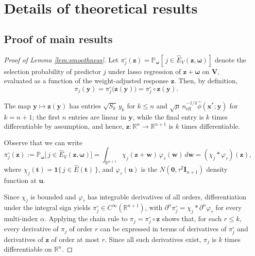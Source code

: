 \documentclass[12pt]{article}
\newcommand{\R}{\mathbb{R}}
\newcommand{\PPo}{\mathbb{P}_{\bm{\omega}}}
\newcommand{\Ehat}{\widehat{E}}
\theoremstyle{definition}
\begin{document}



% 


\appendix

\section{Details of theoretical results}

\subsection{Proof of main results}
\label{App: main}

\begin{proof}[Proof of Lemma \ref{lem:smoothness}]
Let $\pi_j^{\circ}(\bm{z})=\PPo[\,j\in\Ehat_V(\bm{z},\bm{\omega})]$ denote the selection probability of predictor $j$ under lasso regression of $\bm{z}+\bm{\omega}$ on $\bm{V}$, evaluated as a function of the weight-adjusted response $\bm{z}$.
Then, by definition, $$\pi_j(\bm{y})=\pi_j^{\circ}\bigl(\bm{z}(\bm{y})\bigr) = \pi_j^{\circ} \circ \bm{z}(\bm{y}).$$

 
The map $\bm{y} \mapsto \bm{z}(\bm{y})$ has entries $\sqrt{S_k}\,y_k$ for
$k\le n$ and $\sqrt{\mu}\,n_{\mathrm{eff}}^{-1/4}\hat\phi(\bm x^{*};\bm y)$ for $k=n+1$; the first $n$ entries are linear in $\bm y$, while the final entry is $k$ times differentiable by assumption, and hence, $\bm z:\R^{n}\to\R^{n+1}$ is $k$ times differentiable. 
 
Observe that we can write
\[
  \pi_j^{\circ}(\bm z)
  :=\PPo\bigl[\,j\in\Ehat_V(\bm z,\bm\omega)\bigr]
  =\int_{\R^{n+1}}\chi_j(\bm z+\bm w)\,\varphi_\tau(\bm w)\,d\bm w
  =(\chi_j*\varphi_\tau)(\bm z),
\]
where $\chi_j(\bm t)=\mathbf 1\{\,j\in\Ehat(\bm t)\,\}$, and
$\varphi_\tau(\bm u)$ is the $N(\bm 0,\tau^{2}\bm I_{n+1})$ density function at $\bm u$. 

Since $\chi_j$ is bounded and $\varphi_\tau$ has integrable derivatives of all orders, differentiation under the integral sign yields $\pi_j^{\circ}\in C^{\infty}(\R^{n+1})$, with $\partial^{\alpha}\pi_j^{\circ}=\chi_j*\partial^{\alpha}\varphi_\tau$ for every multi-index $\alpha$. Applying the chain rule to $\pi_j=\pi_j^{\circ}\circ\bm z$ shows that, for each $r\le k$, every derivative of $\pi_j$ of order $r$ can be expressed in terms of derivatives of $\pi_j^{\circ}$ and derivatives of $\bm z$ of order at most $r$. Since all such derivatives exist, $\pi_j$ is $k$ times differentiable on $\R^{n}$.
\end{proof}
\end{document}
